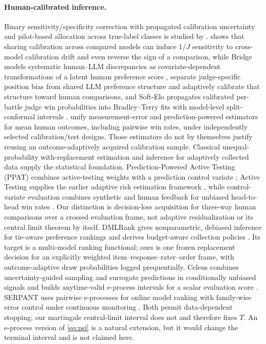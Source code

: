 \documentclass{article}
\begin{document}
\paragraph{Human-calibrated inference.}
Binary sensitivity/specificity correction with propagated calibration
uncertainty and pilot-based allocation across true-label classes is studied by
\citet{lee2026report}. \citet{fiedler2026bias} shows that sharing calibration
across compared models can induce $1/J$ sensitivity to cross-model calibration
drift and even reverse the sign of a comparison, while Bridge models systematic
human--LLM discrepancies as covariate-dependent transformations of a latent
human preference score \cite{polo2025bridge}, \citet{cai2026dial}
separate judge-specific position bias from shared LLM preference structure and
adaptively calibrate that structure toward human comparisons, and Soft-Elo
propagates calibrated per-battle judge win probabilities into Bradley--Terry
fits with model-level split-conformal intervals \cite{kargi2026softelo}.
\citet{chen2026efficient} unify measurement-error and
prediction-powered estimators for mean human outcomes, including pairwise win
rates, under independently selected calibration/test designs. Those estimators
do not by themselves justify reusing an outcome-adaptively acquired
calibration sample. Classical unequal-probability
with-replacement estimation \cite{hansen1943sampling} and inference for
adaptively collected data \cite{hadad2021confidence} supply the statistical
foundation. Prediction-Powered Active Testing (PPAT) combines
active-testing weights with a prediction control variate
\cite{caron2026ppat}; Active Testing supplies the earlier adaptive risk
estimation framework \cite{kossen2021active}, while control-variate evaluation
combines synthetic and human feedback for unbiased head-to-head win rates
\cite{zhou2025synthetic}. Our distinction is decision-loss acquisition for
three-way human comparisons over a crossed evaluation frame, not adaptive
residualization or its central limit theorem by itself.
DMLRank gives nonparametric, debiased inference for tie-aware preference
rankings and derives budget-aware collection policies
\cite{frauen2026dmlrank}. Its target is a multi-model ranking functional; ours
is one frozen replacement decision for an explicitly weighted
item--response--rater--order frame, with outcome-adaptive draw probabilities
logged prequentially.
Celeus combines uncertainty-guided sampling and surrogate predictions in
conditionally unbiased signals and builds anytime-valid e-process intervals for
a scalar evaluation score \cite{zhou2026celeus}. SERPANT uses pairwise
e-processes for online model ranking with family-wise error control under
continuous monitoring \cite{gu2026serpant}. Both permit data-dependent
stopping; our martingale central-limit interval does not and therefore fixes
$T$. An e-process version of \cref{eq:psi} is a natural extension, but it
would change the terminal interval and is not claimed here.
\end{document}
